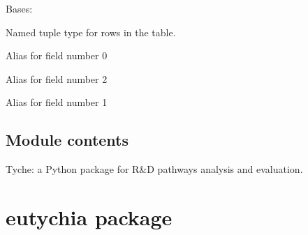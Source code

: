 \documentclass[letterpaper,10pt,english]{sphinxmanual}
\begin{document}
\begin{fulllineitems}
\label{\detokenize{doc-src/tyche:tyche.Types.Results}}
Bases: 

Named tuple type for rows in the  table.

\begin{fulllineitems}
\label{\detokenize{doc-src/tyche:tyche.Types.Results.cost}}
Alias for field number 0

\end{fulllineitems}


\begin{fulllineitems}
\label{\detokenize{doc-src/tyche:tyche.Types.Results.metric}}
Alias for field number 2

\end{fulllineitems}


\begin{fulllineitems}
\label{\detokenize{doc-src/tyche:tyche.Types.Results.output}}
Alias for field number 1

\end{fulllineitems}


\end{fulllineitems}



\subsection{Module contents}
\label{\detokenize{doc-src/tyche:module-tyche}}\label{\detokenize{doc-src/tyche:module-contents}}
Tyche: a Python package for R\&D pathways analysis and evaluation.


\section{eutychia package}
\label{\detokenize{doc-src/eutychia:eutychia-package}}\label{\detokenize{doc-src/eutychia::doc}}
\end{document}

